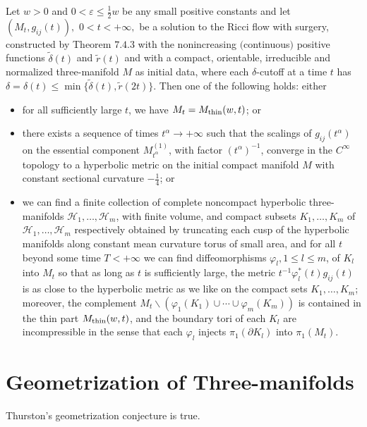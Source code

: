 \begin{theorem}
  \label{thm:cz-surgery-long-time-geometry}

Let $w\!>0$ and $0<\!\varepsilon\leq\!\frac{1}{2}w$ be any small
positive constants and let $(M_t,g_{ij}(t)),$ $0<t<+\infty,$ be a
solution to the Ricci flow with surgery, constructed by Theorem
$7.4.3$ with the nonincreasing $($continuous$)$ positive functions
$\widetilde{\delta}(t)$ and $\widetilde{r}(t)$ and with a compact,
orientable, irreducible and normalized three-manifold $M$ as
initial data, where each $\delta$-cutoff at a time $t$ has
$\delta=\delta(t) \leq \min
\{\widetilde{\delta}(t),\widetilde{r}(2t)\}$. Then one of the
following holds: either
\begin{itemize}
\item[(i)] for all sufficiently large $t$, we have $M_t = M_{\rm
thin}(w,t)$; or \item[(ii)] there exists a sequence of times
$t^{\alpha}\rightarrow+\infty$ such that the scalings of
$g_{ij}(t^{\alpha})$ on the essential component
$M_{t^\alpha}^{(1)}$, with factor $(t^{\alpha})^{-1}$, converge in
the $C^{\infty}$ topology to a hyperbolic metric on the initial
compact manifold $M$ with constant sectional curvature
$-\frac{1}{4}$; or \item[(iii)] we can find a finite collection of
complete noncompact hyperbolic three-manifolds
$\mathcal{H}_1,\ldots,\mathcal{H}_m$, with finite volume, and
compact subsets $K_1,\ldots,K_m$ of
$\mathcal{H}_1,\ldots,\mathcal{H}_m$ respectively obtained by
truncating each cusp of the hyperbolic manifolds along constant
mean curvature torus of small area, and for all $t$ beyond some
time $T<+\infty$ we can find diffeomorphisms $\varphi_l,1\leq
l\leq m$, of $K_l$ into $M_t$ so that as long as $t$ is
sufficiently large, the metric $t^{-1}\varphi^*_l(t)g_{ij}(t)$ is
as close to the hyperbolic metric as we like on the compact sets
$K_1,\ldots,K_m$; moreover, the complement $M_t\backslash
(\varphi_1(K_1)\cup\cdots\cup\varphi_m(K_m))$ is contained in the
thin part $M_{\rm thin}(w,t)$, and the boundary tori of each $K_l$
are incompressible in the sense that each $\varphi_l$ injects
$\pi_1(\partial K_l)$ into $\pi_1(M_t)$.
\end{itemize}
\end{theorem}
\section{Geometrization of Three-manifolds}
\begin{theorem}
  \label{thm:cz-thurston-geometrization}

Thurston's geometrization conjecture is true.
\end{theorem}
